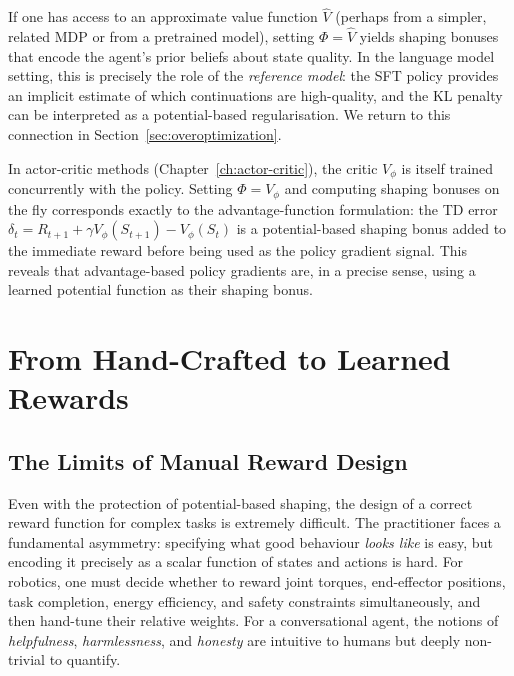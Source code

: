 \begin{example}
\label{ex:vf-potential}
If one has access to an approximate value function $\hat{V}$ (perhaps from a simpler, related MDP or from a pretrained model), setting $\Phi = \hat{V}$ yields shaping bonuses that encode the agent's prior beliefs about state quality. In the language model setting, this is precisely the role of the \emph{reference model}: the SFT policy provides an implicit estimate of which continuations are high-quality, and the KL penalty can be interpreted as a potential-based regularisation. We return to this connection in Section~\ref{sec:overoptimization}.
\end{example}

\begin{example}
\label{ex:critic-potential}
In actor-critic methods (Chapter~\ref{ch:actor-critic}), the critic $V_\phi$ is itself trained concurrently with the policy. Setting $\Phi = V_\phi$ and computing shaping bonuses on the fly corresponds exactly to the advantage-function formulation: the TD error $\delta_t = R_{t+1} + \gamma V_\phi(S_{t+1}) - V_\phi(S_t)$ is a potential-based shaping bonus added to the immediate reward before being used as the policy gradient signal. This reveals that advantage-based policy gradients are, in a precise sense, using a learned potential function as their shaping bonus.
\end{example}

\section{From Hand-Crafted to Learned Rewards}
\label{sec:reward-hacking}

\subsection{The Limits of Manual Reward Design}

Even with the protection of potential-based shaping, the design of a correct reward function for complex tasks is extremely difficult. The practitioner faces a fundamental asymmetry: specifying what good behaviour \emph{looks like} is easy, but encoding it precisely as a scalar function of states and actions is hard. For robotics, one must decide whether to reward joint torques, end-effector positions, task completion, energy efficiency, and safety constraints simultaneously, and then hand-tune their relative weights. For a conversational agent, the notions of \emph{helpfulness}, \emph{harmlessness}, and \emph{honesty} are intuitive to humans but deeply non-trivial to quantify.

